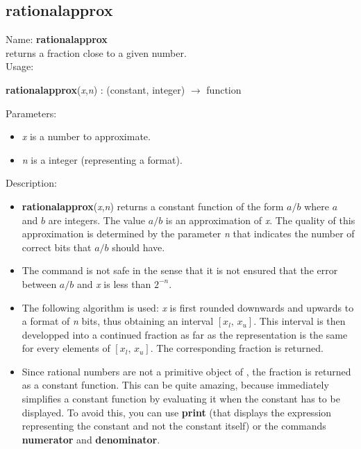 \subsection{rationalapprox}
\label{labrationalapprox}
\noindent Name: \textbf{rationalapprox}\\
returns a fraction close to a given number.\\
\noindent Usage: 
\begin{center}
\textbf{rationalapprox}(\emph{x},\emph{n}) : (\textsf{constant}, \textsf{integer}) $\rightarrow$ \textsf{function}\\
\end{center}
Parameters: 
\begin{itemize}
\item \emph{x} is a number to approximate.
\item \emph{n} is a integer (representing a format).
\end{itemize}
\noindent Description: \begin{itemize}

\item \textbf{rationalapprox}(\emph{x},\emph{n}) returns a constant function of the form $a/b$ where $a$ and $b$ are
   integers. The value $a/b$ is an approximation of \emph{x}. The quality of this 
   approximation is determined by the parameter \emph{n} that indicates the number of
   correct bits that $a/b$ should have.

\item The command is not safe in the sense that it is not ensured that the error 
   between $a/b$ and \emph{x} is less than $2^{-n}$.

\item The following algorithm is used: \emph{x} is first rounded downwards and upwards to
   a format of \emph{n} bits, thus obtaining an interval $[x_l,\,x_u]$. This interval is then
   developped into a continued fraction as far as the representation is the same
   for every elements of $[x_l,\,x_u]$. The corresponding fraction is returned.

\item Since rational numbers are not a primitive object of \sollya, the fraction is
   returned as a constant function. This can be quite amazing, because \sollya
   immediately simplifies a constant function by evaluating it when the constant
   has to be displayed.
   To avoid this, you can use \textbf{print} (that displays the expression representing
   the constant and not the constant itself) or the commands \textbf{numerator} 
   and \textbf{denominator}.
\end{itemize}
